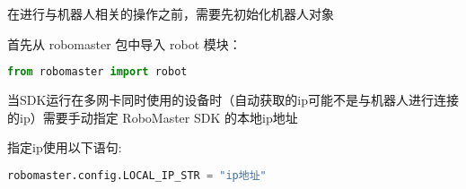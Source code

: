 

\begin{issues}
\issueDraft
\end{issues}

在进行与机器人相关的操作之前，需要先初始化机器人对象

首先从 robomaster 包中导入 robot 模块：

\begin{lstlisting}[language=python]
from robomaster import robot
\end{lstlisting}

当SDK运行在多网卡同时使用的设备时（自动获取的ip可能不是与机器人进行连接的ip）需要手动指定 RoboMaster SDK 的本地ip地址

指定ip使用以下语句:

\begin{lstlisting}[language=python]
robomaster.config.LOCAL_IP_STR = "ip地址"
\end{lstlisting}
